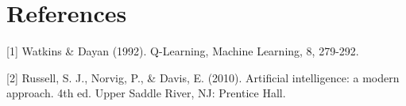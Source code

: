 \documentclass{article}
\begin{document}




\section{References}

[1] Watkins \& Dayan (1992). Q-Learning, Machine Learning, 8, 279-292.
 
[2] Russell, S. J., Norvig, P., \& Davis, E. (2010). Artificial intelligence: a modern approach. 4th ed. Upper Saddle River, NJ: Prentice Hall.

\end{document}
